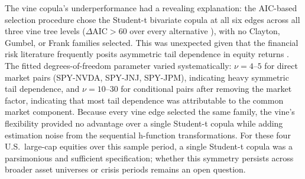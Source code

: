 The vine copula's underperformance had a revealing explanation: the AIC-based selection procedure chose the Student-t bivariate copula at all six edges across all three vine tree levels ($\Delta\text{AIC} > 60$ over every alternative \cite{burnham_model_2002}), with no Clayton, Gumbel, or Frank families selected. This was unexpected given that the financial risk literature frequently posits asymmetric tail dependence in equity returns \cite{ang_asymmetric_2002, longin_extreme_2001}. The fitted degrees-of-freedom parameter varied systematically: $\nu=4$--$5$ for direct market pairs (SPY-NVDA, SPY-JNJ, SPY-JPM), indicating heavy symmetric tail dependence, and $\nu=10$--$30$ for conditional pairs after removing the market factor, indicating that most tail dependence was attributable to the common market component. Because every vine edge selected the same family, the vine's flexibility provided no advantage over a single Student-t copula while adding estimation noise from the sequential h-function transformations. For these four U.S.\ large-cap equities over this sample period, a single Student-t copula was a parsimonious and sufficient specification; whether this symmetry persists across broader asset universes or crisis periods remains an open question.